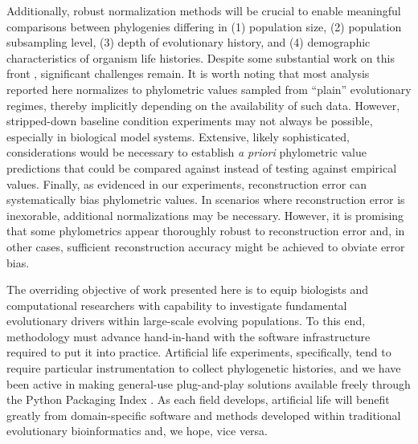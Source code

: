 Additionally, robust normalization methods will be crucial to enable meaningful comparisons between phylogenies differing in (1) population size, (2) population subsampling level, (3) depth of evolutionary history, and (4) demographic characteristics of organism life histories.
Despite some substantial work on this front \citep{shao1990tree,mir2018sound}, significant challenges remain.
It is worth noting that most analysis reported here normalizes to phylometric values sampled from ``plain'' evolutionary regimes, thereby implicitly depending on the availability of such data.
However, stripped-down baseline condition experiments may not always be possible, especially in biological model systems.
Extensive, likely sophisticated, considerations would be necessary to establish \textit{a priori} phylometric value predictions that could be compared against instead of testing against empirical values.
Finally, as evidenced in our experiments, reconstruction error can systematically bias phylometric values.
In scenarios where reconstruction error is inexorable, additional normalizations may be necessary.
However, it is promising that some phylometrics appear thoroughly robust to reconstruction error and, in other cases, sufficient reconstruction accuracy might be achieved to obviate error bias.

The overriding objective of work presented here is to equip biologists and computational researchers with capability to investigate fundamental evolutionary drivers within large-scale evolving populations.
To this end, methodology must advance hand-in-hand with the software infrastructure required to put it into practice.
Artificial life experiments, specifically, tend to require particular instrumentation to collect phylogenetic histories, and we have been active in making general-use plug-and-play solutions available freely through the Python Packaging Index \citep{moreno2022hstrat,dolson2024phylotrackpy}.
As each field develops, artificial life will benefit greatly from domain-specific software and methods developed within traditional evolutionary bioinformatics and, we hope, vice versa.




